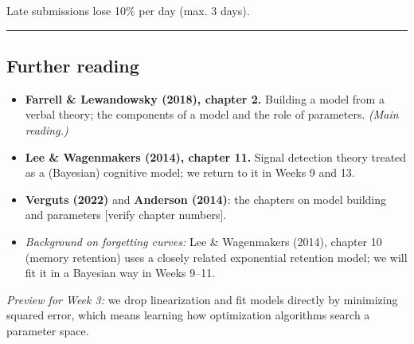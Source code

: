 Late submissions lose 10\% per day (max. 3 days).

\begin{center}\rule{0.5\linewidth}{0.5pt}\end{center}

\subsection{Further reading}

\begin{itemize}
\tightlist
\item
  \textbf{Farrell \& Lewandowsky (2018), chapter 2.} Building a model
  from a verbal theory; the components of a model and the role of
  parameters. \emph{(Main reading.)}
\item
  \textbf{Lee \& Wagenmakers (2014), chapter 11.} Signal detection
  theory treated as a (Bayesian) cognitive model; we return to it in
  Weeks 9 and 13.
\item
  \textbf{Verguts (2022)} and \textbf{Anderson (2014)}: the chapters on
  model building and parameters {[}verify chapter numbers{]}.
\item
  \emph{Background on forgetting curves:} Lee \& Wagenmakers (2014),
  chapter 10 (memory retention) uses a closely related exponential
  retention model; we will fit it in a Bayesian way in Weeks 9--11.
\end{itemize}

\emph{Preview for Week 3:} we drop linearization and fit models directly
by minimizing squared error, which means learning how optimization
algorithms search a parameter space.
